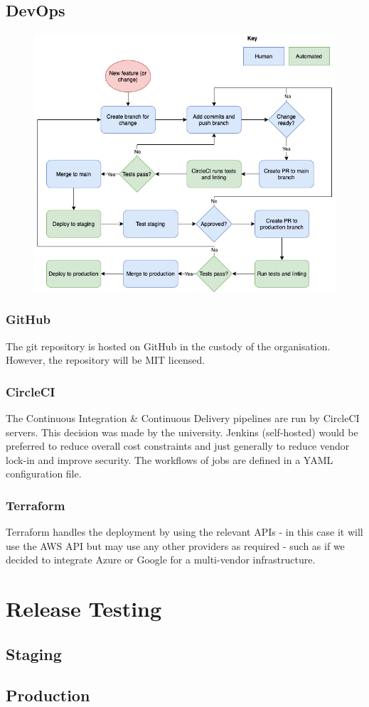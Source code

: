 \documentclass[10pt]{article}
\begin{document}
\subsection{DevOps}
\begin{figure}[h!]
	\centering
	\includegraphics[width=0.9\linewidth]{images/DevOpsWorkflow.png}	
\end{figure}

\subsubsection{GitHub}
The git repository is hosted on GitHub in the custody of the organisation. However, the repository will be MIT licensed.
\subsubsection{CircleCI}
The Continuous Integration \& Continuous Delivery pipelines are run by CircleCI servers. This decision was made by the university. Jenkins (self-hosted) would be preferred to reduce overall cost constraints and just generally to reduce vendor lock-in and improve security. The workflows of jobs are defined in a YAML configuration file. 
\subsubsection{Terraform}
Terraform handles the deployment by using the relevant APIs - in this case it will use the AWS API but may use any other providers as required - such as if we decided to integrate Azure or Google for a multi-vendor infrastructure.


\section{Release Testing}
\subsection{Staging}
\subsection{Production}


\newpage
\printbibliography
\end{document}
